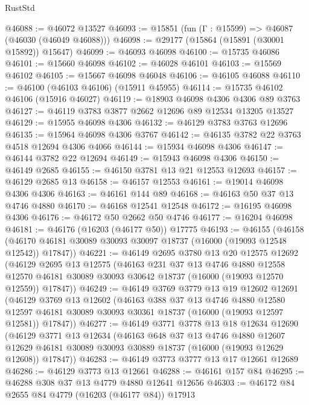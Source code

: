 \begin{lexlean}{RustStd}
\begin{coremodule}
@46088 := @46072 @13527
@46093 := @15851 (fun (Γ : @15599) => @46087 (@46030 (@46049 @46088)))
@46098 := @29177 (@15864 (@15891 (@30001 @15892)) @15647)
@46099 := @46093 @46098
@46100 := @15735 @46086
@46101 := @15660 @46098
@46102 := @46028 @46101
@46103 := @15569 @46102
@46105 := @15667 @46098 @46048
@46106 := @46105 @46088
@46110 := @46100 (@46103 @46106) (@15911 @45955)
@46114 := @15735 @46102 @46106 (@15916 @46027)
@46119 := @18903 @46098 @4306 @4306 @89 @3763
@46127 := @46119 @3783 @3877 @2662 @12696 @89 @12534 @13205 @13527
@46129 := @15955 @46098 @4306
@46132 := @46129 @3783 @3763 @12696
@46135 := @15964 @46098 @4306 @3767
@46142 := @46135 @3782 @22 @3763 @4518 @12694 @4306 @4066
@46144 := @15934 @46098 @4306
@46147 := @46144 @3782 @22 @12694
@46149 := @15943 @46098 @4306
@46150 := @46149 @2685
@46155 := @46150 @3781 @13 @21 @12553 @12693
@46157 := @46129 @2685 @13
@46158 := @46157 @12553
@46161 := @19014 @46098 @4306 @4306
@46163 := @46161 @144 @89
@46168 := @46163 @50 @37 @13 @4746 @4880
@46170 := @46168 @12541 @12548
@46172 := @16195 @46098 @4306
@46176 := @46172 @50 @2662 @50 @4746
@46177 := @16204 @46098
@46181 := @46176 (@16203 (@46177 @50)) @17775
@46193 := @46155
    (@46158 (@46170 @46181 @30089 @30093 @30097 @18737 (@16000 (@19093 @12548 @12542)) @17847))
@46221 := @46149
    @2695
    @3780
    @13
    @20
    @12575
    @12692
    (@46129
      @2695
      @13
      @12575
      (@46163
        @231
        @37
        @13
        @4746
        @4880
        @12558
        @12570
        @46181
        @30089
        @30093
        @30642
        @18737
        (@16000 (@19093 @12570 @12559))
        @17847))
@46249 := @46149
    @3769
    @3779
    @13
    @19
    @12602
    @12691
    (@46129
      @3769
      @13
      @12602
      (@46163
        @388
        @37
        @13
        @4746
        @4880
        @12580
        @12597
        @46181
        @30089
        @30093
        @30361
        @18737
        (@16000 (@19093 @12597 @12581))
        @17847))
@46277 := @46149
    @3771
    @3778
    @13
    @18
    @12634
    @12690
    (@46129
      @3771
      @13
      @12634
      (@46163
        @648
        @37
        @13
        @4746
        @4880
        @12607
        @12629
        @46181
        @30089
        @30093
        @30889
        @18737
        (@16000 (@19093 @12629 @12608))
        @17847))
@46283 := @46149 @3773 @3777 @13 @17 @12661 @12689
@46286 := @46129 @3773 @13 @12661
@46288 := @46161 @157 @84
@46295 := @46288 @308 @37 @13 @4779 @4880 @12641 @12656
@46303 := @46172 @84 @2655 @84 @4779 (@16203 (@46177 @84)) @17913

\end{coremodule}
\end{lexlean}
